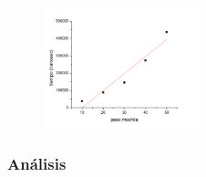 \documentclass[spanish,12pt]{article}
\begin{document}
\begin{figure}[H]
\centering
\includegraphics[width=0.4\textwidth]{variacionPesoMoch}
\caption{}
\end{figure}

\subsubsection{Análisis}
\end{document}
